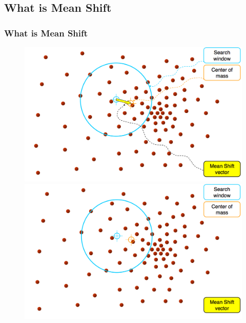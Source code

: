 \documentclass[notheorems,serif,table,compress]{beamer}  %
\begin{document}
\subsection{What is Mean Shift}
\begin{frame}
\frametitle{What is Mean Shift}
    \begin{figure}
      \begin{minipage}[t]{0.45\linewidth}
      \includegraphics[width=1\linewidth]{meanshift1.png} 
      \end{minipage}
      \pause
      \begin{minipage}[t]{0.45\linewidth}
      \includegraphics[width=1\linewidth]{meanshift2.png} 
      \end{minipage}
    \end{figure}
    \pause
    \begin{figure}
      \begin{minipage}[t]{0.45\linewidth}

\end{minipage}
\end{figure}
\end{frame}
\end{document}
